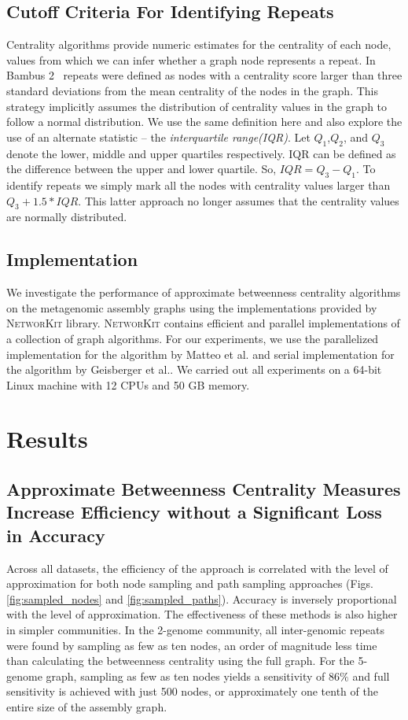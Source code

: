 \documentclass[runningheads,a4paper]{llncs}
\begin{document}
\subsection*{Cutoff Criteria For Identifying Repeats}
Centrality algorithms provide numeric estimates for the centrality of each node, values from which we can infer whether a graph node represents a repeat. In Bambus 2~\cite{bambus} repeats were defined as nodes with a centrality score larger than three standard deviations from the mean centrality of the nodes in the graph. This strategy implicitly assumes the distribution of centrality values in the graph to follow a normal distribution.  We use the same definition here and also explore the use of an alternate statistic -- the  \textit{interquartile range(IQR)}. Let $Q_{1}$,$Q_{2}$, and $Q_{3}$ denote the lower, middle and upper quartiles respectively. IQR can be defined as the difference between the upper and lower quartile. So, $IQR = Q_{3} - Q_{1}$. To identify repeats we simply mark  all the nodes with centrality values larger than $Q_{3} + 1.5*IQR$. This latter approach no longer assumes that the centrality values are normally distributed. 

\subsection*{Implementation}
We investigate the performance of approximate betweenness centrality algorithms on the metagenomic assembly graphs using the implementations provided by \textsc{NetworKit}\cite{networkit} library. \textsc{NetworKit} contains efficient and parallel implementations of a collection of graph algorithms.
For our experiments, we use the parallelized implementation for the algorithm by Matteo et al.\cite{matteo} and serial implementation for the algorithm by Geisberger et al.\cite{sanders}.
We carried out all experiments on a 64-bit Linux machine with 12 CPUs and 50 GB memory. 

\section{Results} 


\subsection*{Approximate Betweenness Centrality Measures Increase Efficiency without a Significant Loss in Accuracy}

Across all datasets, the efficiency of the approach is correlated with the level of approximation for both node sampling and path sampling approaches (Figs. \ref{fig:sampled_nodes} and \ref{fig:sampled_paths}).  Accuracy is inversely proportional with the level of approximation.  The effectiveness of these methods is also higher in simpler communities.  In the 2-genome community,  all inter-genomic repeats were found by sampling as few as ten nodes, an order of magnitude less time than calculating the betweenness centrality using the full graph.  For the 5-genome graph, sampling as few as ten nodes yields a sensitivity of $86\%$ and full sensitivity is achieved with just 500 nodes, or approximately one tenth of the entire size of the assembly graph.  
\end{document}
